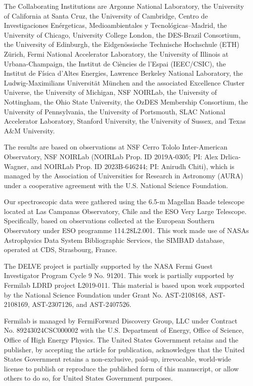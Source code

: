 \documentclass[pdflatex,sn-nature]{sn-jnl}%
\theoremstyle{thmstyleone}%
\theoremstyle{thmstyletwo}%
\theoremstyle{thmstylethree}%
\begin{document}
The Collaborating Institutions are Argonne National Laboratory, the University of California at Santa Cruz, the University of Cambridge, Centro de Investigaciones Enérgeticas, Medioambientales y Tecnológicas–Madrid, the University of Chicago, University College London, the DES-Brazil Consortium, the University of Edinburgh, the Eidgenössische Technische Hochschule (ETH) Zürich, Fermi National Accelerator Laboratory, the University of Illinois at Urbana-Champaign, the Institut de Ciències de l’Espai (IEEC/CSIC), the Institut de Física d’Altes Energies, Lawrence Berkeley National Laboratory, the Ludwig-Maximilians Universität München and the associated Excellence Cluster Universe, the University of Michigan, NSF NOIRLab, the University of Nottingham, the Ohio State University, the OzDES Membership Consortium, the University of Pennsylvania, the University of Portsmouth, SLAC National Accelerator Laboratory, Stanford University, the University of Sussex, and Texas A\&M University.

The results are based on observations at NSF Cerro Tololo Inter-American Observatory, NSF NOIRLab (NOIRLab Prop. ID 2019A-0305; PI: Alex Drlica-Wagner, and NOIRLab Prop. ID 2023B-646244; PI: Anirudh Chiti), which is managed by the Association of Universities for Research in Astronomy (AURA) under a cooperative agreement with the U.S. National Science Foundation.

Our spectroscopic data were gathered using the 6.5-m Magellan Baade telescope located at Las Campanas Observatory, Chile and the ESO Very Large Telescope.
Specifically, based on observations collected at the European Southern Observatory under ESO programme 114.28L2.001. This work made use of NASAs Astrophysics Data System Bibliographic Services, the SIMBAD database\cite{woe+00}, operated at CDS, Strasbourg, France. 

The DELVE project is partially supported by the NASA Fermi Guest Investigator Program Cycle 9 No. 91201.
This work is partially supported by Fermilab LDRD project L2019-011. 
This material is based upon work supported by the National Science Foundation under Grant No. AST-2108168, AST-2108169, AST-2307126, and AST-2407526.

Fermilab is managed by FermiForward Discovery Group, LLC under Contract No. 89243024CSC000002 with the U.S. Department of Energy, Office of Science, Office of High Energy Physics. The United States Government retains and the publisher, by accepting the article for publication, acknowledges that the United States Government retains a non-exclusive, paid-up, irrevocable, world-wide license to publish or reproduce the published form of this manuscript, or allow others to do so, for United States Government purposes.
\end{document}
